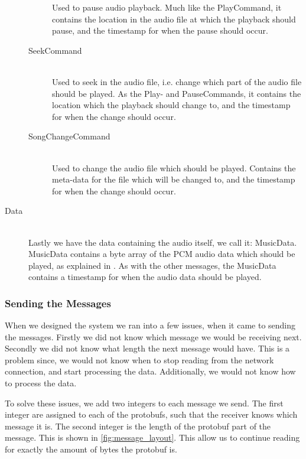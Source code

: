 \begin{description}
\begin{description}
                Used to pause audio playback.
                Much like the PlayCommand, it contains the location in the audio file at which the playback should pause, and the timestamp for when the pause should occur.
            \item[SeekCommand] \hfill\\
                Used to seek in the audio file, i.e. change which part of the audio file should be played.
                As the Play- and PauseCommands, it contains the location which the playback should change to, and the timestamp for when the change should occur.
            \item[SongChangeCommand] \hfill\\
                Used to change the audio file which should be played.
                Contains the meta-data for the file which will be changed to, and the timestamp for when the change should occur.
        \end{description}

    \item[Data] \hfill \\
        Lastly we have the data containing the audio itself, we call it: MusicData.
        MusicData contains a byte array of the \ac{PCM} audio data which should be played, as explained in .
        As with the other messages, the MusicData contains a timestamp for when the audio data should be played.
\end{description}

\subsubsection*{Sending the Messages}
When we designed the system we ran into a few issues, when it came to sending the messages.
Firstly we did not know which message we would be receiving next.
Secondly we did not know what length the next message would have.
This is a problem since, we would not know when to stop reading from the network connection, and start processing the data.
Additionally, we would not know how to process the data.

To solve these issues, we add two integers to each message we send.
The first integer are assigned to each of the protobufs, such that the receiver knows which message it is.
The second integer is the length of the protobuf part of the message.
This is shown in \cref{fig:message_layout}.
This allow us to continue reading for exactly the amount of bytes the protobuf is.

